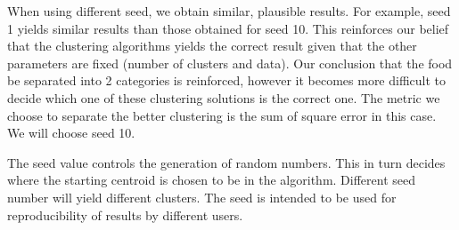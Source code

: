 \documentclass[letterpaper,12pt]{article}
\begin{document}
When using different seed, we obtain similar, plausible results. For example, seed 1 yields similar results than those obtained for seed 10. This reinforces our belief that the clustering algorithms yields the correct result given that the other parameters are fixed (number of clusters and data). Our conclusion that the food be separated into 2 categories is reinforced, however it becomes more difficult to decide which one of these clustering solutions is the correct one. The metric we choose to separate the better clustering is the sum of square error in this case. We will choose seed 10.

The seed value controls the generation of random numbers. This in turn decides where the starting centroid is chosen to be in the algorithm. Different seed number will yield different clusters. The seed is intended to be used for reproducibility of results by different users.
\end{document}
